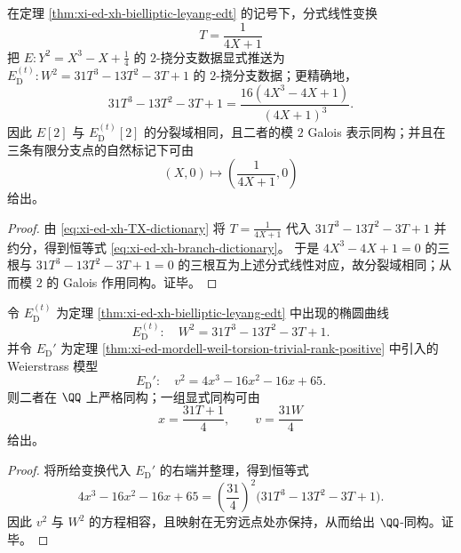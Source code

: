 \begin{proposition}\label{prop:xi-ed-xh-2torsion-dictionary-mod2}
在定理 \ref{thm:xi-ed-xh-bielliptic-leyang-edt} 的记号下，分式线性变换
\[
T=\frac{1}{4X+1}
\]
把 \(E: Y^2=X^3-X+\tfrac14\) 的 \(2\)-挠分支数据显式推送为 \(E_{\mathrm D}^{(t)}:W^2=31T^3-13T^2-3T+1\) 的 \(2\)-挠分支数据；更精确地，
\begin{equation}\label{eq:xi-ed-xh-branch-dictionary}
31T^3-13T^2-3T+1
=\frac{16(4X^3-4X+1)}{(4X+1)^3}.
\end{equation}
因此 \(E[2]\) 与 \(E_{\mathrm D}^{(t)}[2]\) 的分裂域相同，且二者的模 \(2\) Galois 表示同构；并且在三条有限分支点的自然标记下可由
\[
(X,0)\longmapsto\left(\frac{1}{4X+1},0\right)
\]
给出。
\end{proposition}
\begin{proof}
由 \eqref{eq:xi-ed-xh-TX-dictionary} 将 \(T=\frac{1}{4X+1}\) 代入 \(31T^3-13T^2-3T+1\) 并约分，得到恒等式 \eqref{eq:xi-ed-xh-branch-dictionary}。
于是 \(4X^3-4X+1=0\) 的三根与 \(31T^3-13T^2-3T+1=0\) 的三根互为上述分式线性对应，故分裂域相同；从而模 \(2\) 的 Galois 作用同构。证毕。
\end{proof}

\begin{proposition}\label{prop:xi-ed-xh-edt-isomorphic-to-edprime-explicit}
令 \(E_{\mathrm D}^{(t)}\) 为定理 \ref{thm:xi-ed-xh-bielliptic-leyang-edt} 中出现的椭圆曲线
\[
E_{\mathrm D}^{(t)}:\quad W^2=31T^3-13T^2-3T+1.
\]
并令 \(E_{\mathrm D}'\) 为定理 \ref{thm:xi-ed-mordell-weil-torsion-trivial-rank-positive} 中引入的 Weierstrass 模型
\[
E_{\mathrm D}':\quad v^{2}=4x^{3}-16x^{2}-16x+65.
\]
则二者在 \(\QQ\) 上严格同构；一组显式同构可由
\[
x=\frac{31T+1}{4},
\qquad
v=\frac{31W}{4}
\]
给出。
\end{proposition}
\begin{proof}
将所给变换代入 \(E_{\mathrm D}'\) 的右端并整理，得到恒等式
\[
4x^{3}-16x^{2}-16x+65
=\left(\frac{31}{4}\right)^{2}\bigl(31T^3-13T^2-3T+1\bigr).
\]
因此 \(v^2\) 与 \(W^2\) 的方程相容，且映射在无穷远点处亦保持，从而给出 \(\QQ\)-同构。证毕。
\end{proof}


